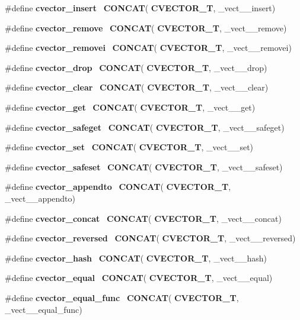 \begin{DoxyCompactItemize}
\item 
\#define \textbf{ cvector\+\_\+insert}~\textbf{ C\+O\+N\+C\+AT}(\textbf{ C\+V\+E\+C\+T\+O\+R\+\_\+T}, \+\_\+vect\+\_\+\+\_\+insert)
\item 
\#define \textbf{ cvector\+\_\+remove}~\textbf{ C\+O\+N\+C\+AT}(\textbf{ C\+V\+E\+C\+T\+O\+R\+\_\+T}, \+\_\+vect\+\_\+\+\_\+remove)
\item 
\#define \textbf{ cvector\+\_\+removei}~\textbf{ C\+O\+N\+C\+AT}(\textbf{ C\+V\+E\+C\+T\+O\+R\+\_\+T}, \+\_\+vect\+\_\+\+\_\+removei)
\item 
\#define \textbf{ cvector\+\_\+drop}~\textbf{ C\+O\+N\+C\+AT}(\textbf{ C\+V\+E\+C\+T\+O\+R\+\_\+T}, \+\_\+vect\+\_\+\+\_\+drop)
\item 
\#define \textbf{ cvector\+\_\+clear}~\textbf{ C\+O\+N\+C\+AT}(\textbf{ C\+V\+E\+C\+T\+O\+R\+\_\+T}, \+\_\+vect\+\_\+\+\_\+clear)
\item 
\#define \textbf{ cvector\+\_\+get}~\textbf{ C\+O\+N\+C\+AT}(\textbf{ C\+V\+E\+C\+T\+O\+R\+\_\+T}, \+\_\+vect\+\_\+\+\_\+get)
\item 
\#define \textbf{ cvector\+\_\+safeget}~\textbf{ C\+O\+N\+C\+AT}(\textbf{ C\+V\+E\+C\+T\+O\+R\+\_\+T}, \+\_\+vect\+\_\+\+\_\+safeget)
\item 
\#define \textbf{ cvector\+\_\+set}~\textbf{ C\+O\+N\+C\+AT}(\textbf{ C\+V\+E\+C\+T\+O\+R\+\_\+T}, \+\_\+vect\+\_\+\+\_\+set)
\item 
\#define \textbf{ cvector\+\_\+safeset}~\textbf{ C\+O\+N\+C\+AT}(\textbf{ C\+V\+E\+C\+T\+O\+R\+\_\+T}, \+\_\+vect\+\_\+\+\_\+safeset)
\item 
\#define \textbf{ cvector\+\_\+appendto}~\textbf{ C\+O\+N\+C\+AT}(\textbf{ C\+V\+E\+C\+T\+O\+R\+\_\+T}, \+\_\+vect\+\_\+\+\_\+appendto)
\item 
\#define \textbf{ cvector\+\_\+concat}~\textbf{ C\+O\+N\+C\+AT}(\textbf{ C\+V\+E\+C\+T\+O\+R\+\_\+T}, \+\_\+vect\+\_\+\+\_\+concat)
\item 
\#define \textbf{ cvector\+\_\+reversed}~\textbf{ C\+O\+N\+C\+AT}(\textbf{ C\+V\+E\+C\+T\+O\+R\+\_\+T}, \+\_\+vect\+\_\+\+\_\+reversed)
\item 
\#define \textbf{ cvector\+\_\+hash}~\textbf{ C\+O\+N\+C\+AT}(\textbf{ C\+V\+E\+C\+T\+O\+R\+\_\+T}, \+\_\+vect\+\_\+\+\_\+hash)
\item 
\#define \textbf{ cvector\+\_\+equal}~\textbf{ C\+O\+N\+C\+AT}(\textbf{ C\+V\+E\+C\+T\+O\+R\+\_\+T}, \+\_\+vect\+\_\+\+\_\+equal)
\item 
\#define \textbf{ cvector\+\_\+equal\+\_\+func}~\textbf{ C\+O\+N\+C\+AT}(\textbf{ C\+V\+E\+C\+T\+O\+R\+\_\+T}, \+\_\+vect\+\_\+\+\_\+equal\+\_\+func)

\end{DoxyCompactItemize}
